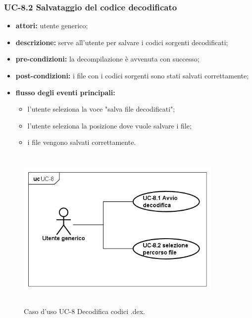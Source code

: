 \subsubsection*{UC-8.2 Salvataggio del codice decodificato}
\begin{itemize}
    \item \textbf{attori:} utente generico;
    \item \textbf{descrizione:} serve all'utente per salvare i codici sorgenti decodificati;
    \item \textbf{pre-condizioni:} la decompilazione è avvenuta con successo;
    \item \textbf{post-condizioni:} i file con i codici sorgenti sono stati salvati correttamente;
    \item \textbf{flusso degli eventi principali:}
    \begin{itemize}
        \item l'utente seleziona la voce "salva file decodificati";
        \item l'utente seleziona la posizione dove vuole salvare i file;
        \item i file vengono salvati correttamente.
    \end{itemize}
\end{itemize}

\begin{figure}[H]
    \centering
    \includegraphics[width=10cm, height=8cm]{./immagini/usecase/uc_8.png}
    \caption{Caso d'uso UC-8 Decodifica codici .dex.}
\end{figure}



